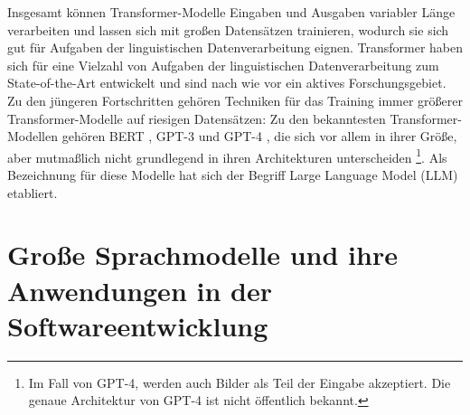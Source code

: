 Insgesamt können Transformer-Modelle Eingaben und Ausgaben variabler Länge verarbeiten und lassen sich mit großen Datensätzen trainieren, wodurch sie sich gut für Aufgaben der linguistischen Datenverarbeitung eignen.
Transformer haben sich für eine Vielzahl von Aufgaben der linguistischen Datenverarbeitung zum State-of-the-Art entwickelt und sind nach wie vor ein aktives Forschungsgebiet.
Zu den jüngeren Fortschritten gehören Techniken für das Training immer größerer Transformer-Modelle auf riesigen Datensätzen:
Zu den bekanntesten Transformer-Modellen gehören BERT \cite{bert}, GPT-3 \cite{FewShotLearners} und GPT-4 \cite{gpt4}, die sich vor allem in ihrer Größe, aber mutmaßlich nicht grundlegend in ihren Architekturen unterscheiden \footnote{Im Fall von GPT-4, werden auch Bilder als Teil der Eingabe akzeptiert. Die genaue Architektur von GPT-4 ist nicht öffentlich bekannt.}.
Als Bezeichnung für diese Modelle hat sich der Begriff \foreignlanguage{english}{Large Language Model} (LLM) etabliert.

\section{Große Sprachmodelle und ihre Anwendungen in der Softwareentwicklung}
\label{subsec:Foundations:LLM}



